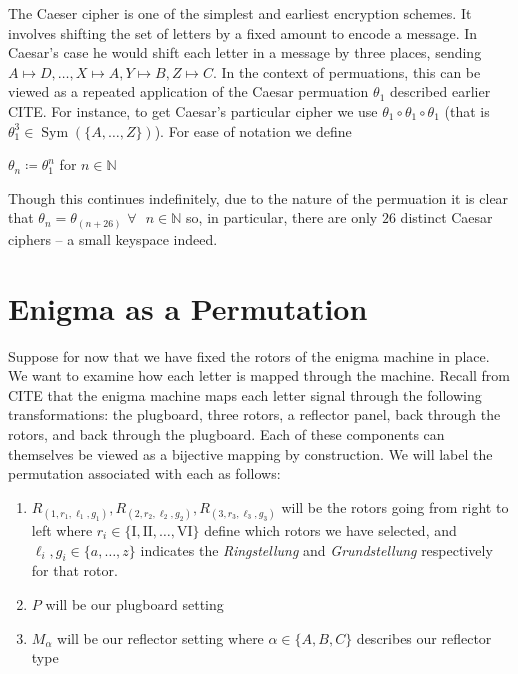 \begin{example}
    The Caeser cipher is one of the simplest and earliest encryption schemes. It involves shifting
    the set of letters by a fixed amount to encode a message. In Caesar's case he would shift each letter in a message by three places, 
    sending $A\mapsto D,\dots, X\mapsto A, Y\mapsto B, Z\mapsto C$. In the context of permuations, this can be viewed as a repeated
    application of the Caesar permuation $\theta_1$ described earlier CITE. For instance, to get Caesar's particular cipher 
    we use $\theta_1\circ\theta_1\circ\theta_1$ (that is $\theta_1^3\in\operatorname{Sym}(\{A,\dots,Z\})$). For ease of notation we define
    \begin{center}
        $\theta_n\coloneq\theta_1^n$ for $n\in\mathbb{N}$
    \end{center}
    Though this continues indefinitely, due to the nature of the permuation it is clear that $\theta_n = \theta_{(n+26)}$ $\forall\text{ }n\in\mathbb{N}$ so, in particular, 
    there are only $26$ distinct Caesar ciphers -- a small keyspace indeed.
\end{example}

\section{Enigma as a Permutation} 

Suppose for now that we have fixed the rotors of the enigma machine in place. We want to examine how each letter is mapped through the machine. 
Recall from CITE that the enigma machine maps each letter signal through the following transformations: the plugboard, three rotors, a reflector panel, back through the rotors, 
and back through the plugboard. Each of these components can themselves be viewed as a bijective mapping by construction. We will label the permutation associated with each  as follows:
\begin{enumerate}
    \item $R_{(1,r_1, \ell_1, g_1)}, R_{(2, r_2, \ell_2, g_2)}, R_{(3, r_3, \ell_3, g_3)}$ will be the rotors going from right to left where 
    $r_i\in \{\text{I}, \text{II}, \dots, \text{VI}\}$ define which rotors we have selected, and $\ell_i, g_i\in\{a, \dots, z\}$ indicates the \emph{Ringstellung} and \emph{Grundstellung} respectively for that rotor.
    \item $P$ will be our plugboard setting
    \item $M_\alpha$ will be our reflector setting where $\alpha\in\{A, B, C\}$ describes our reflector type
\end{enumerate}

